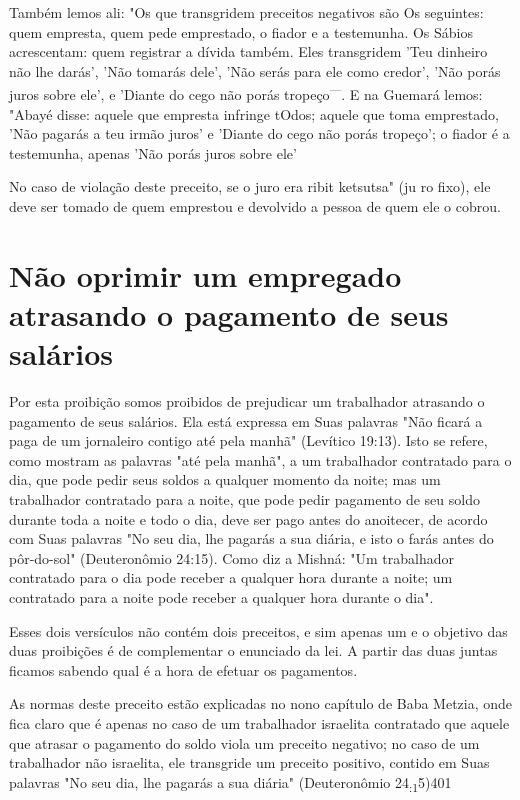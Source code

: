 \begin{itemize}
\begin{enumrate}
\begin{itemize}
\begin{itemize}
\begin{itemize}
Também lemos ali: "Os que transgridem preceitos negativos são Os
seguintes: quem empresta, quem pede emprestado, o fiador e a testemunha.
Os Sábios acrescentam: quem registrar a dívida também. Eles transgridem
'Teu dinheiro não lhe darás', 'Não tomarás dele', 'Não serás para ele
como credor', 'Não porás juros sobre ele', e 'Diante do cego não porás
tropeço\textsuperscript{---}. E na Gue­mará lemos: "Abayé disse: aquele
que empresta infringe tOdos; aquele que to­ma emprestado, 'Não pagarás a
teu irmão juros' e 'Diante do cego não porás tropeço'; o fiador é a
testemunha, apenas 'Não porás juros sobre ele'

No caso de violação deste preceito, se o juro era ribit ketsutsa" (ju ro
fixo), ele deve ser tomado de quem emprestou e devolvido a pessoa de
quem ele o cobrou.


\section{Não oprimir um empregado atrasando o pagamento de seus salários}

Por esta proibição somos proibidos de prejudicar um trabalhador
atra­sando o pagamento de seus salários. Ela está expressa em Suas
palavras "Não ficará a paga de um jornaleiro contigo até pela manhã"
(Levítico 19:13). Isto se refere, como mostram as palavras "até pela
manhã", a um trabalhador con­tratado para o dia, que pode pedir seus
soldos a qualquer momento da noite; mas um trabalhador contratado para a
noite, que pode pedir pagamento de seu soldo durante toda a noite e todo
o dia, deve ser pago antes do anoitecer, de acordo com Suas palavras "No
seu dia, lhe pagarás a sua diária, e isto o farás antes do pôr-do-sol"
(Deuteronômio 24:15). Como diz a Mishná: "Um traba­lhador contratado
para o dia pode receber a qualquer hora durante a noite; um contratado
para a noite pode receber a qualquer hora durante o dia".

Esses dois versículos não contém dois preceitos, e sim apenas um e o
objetivo das duas proibições é de complementar o enunciado da lei. A
par­tir das duas juntas ficamos sabendo qual é a hora de efetuar os
pagamentos.

As normas deste preceito estão explicadas no nono capítulo de Baba
Metzia, onde fica claro que é apenas no caso de um trabalhador israelita
contra­tado que aquele que atrasar o pagamento do soldo viola um
preceito negativo; no caso de um trabalhador não israelita, ele
transgride um preceito positivo, contido em Suas palavras "No seu dia,
lhe pagarás a sua diária" (Deuteronômio 24\textsubscript{:1}5)401


\end{itemize}
\end{itemize}
\end{itemize}
\end{enumrate}
\end{itemize}
